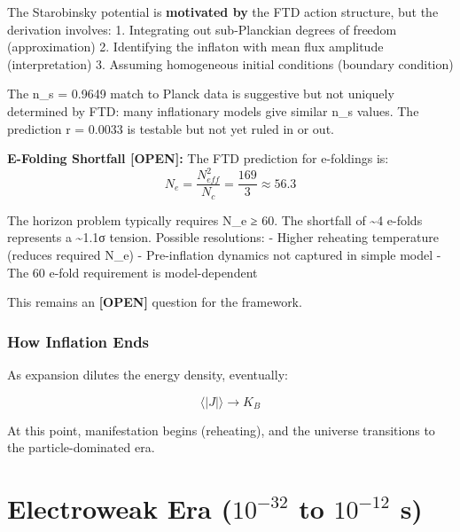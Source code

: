\documentclass[
  11pt,
  letterpaper,
  twoside,
  openright]{book}
\begin{document}
\begin{tcolorbox}[enhanced jigsaw, leftrule=.75mm, title=\textcolor{quarto-callout-warning-color}{\faExclamationTriangle}\hspace{0.5em}{Epistemic Status: Inflation {[}OPEN ISSUES{]}}, bottomrule=.15mm, opacityback=0, coltitle=black, arc=.35mm, colframe=quarto-callout-warning-color-frame, colbacktitle=quarto-callout-warning-color!10!white, colback=white, titlerule=0mm, breakable, bottomtitle=1mm, toptitle=1mm, rightrule=.15mm, toprule=.15mm, left=2mm, opacitybacktitle=0.6]

The Starobinsky potential is \textbf{motivated by} the FTD action
structure, but the derivation involves: 1. Integrating out sub-Planckian
degrees of freedom (approximation) 2. Identifying the inflaton with mean
flux amplitude (interpretation) 3. Assuming homogeneous initial
conditions (boundary condition)

The n\_s = 0.9649 match to Planck data is suggestive but not uniquely
determined by FTD: many inflationary models give similar n\_s values.
The prediction r = 0.0033 is testable but not yet ruled in or out.

\textbf{E-Folding Shortfall {[}OPEN{]}:} The FTD prediction for
e-foldings is:
\[N_e = \frac{N_{eff}^2}{N_c} = \frac{169}{3} \approx 56.3\]

The horizon problem typically requires N\_e ≥ 60. The shortfall of
\textasciitilde4 e-folds represents a \textasciitilde1.1σ tension.
Possible resolutions: - Higher reheating temperature (reduces required
N\_e) - Pre-inflation dynamics not captured in simple model - The 60
e-fold requirement is model-dependent

This remains an \textbf{{[}OPEN{]}} question for the framework.

\end{tcolorbox}

\subsubsection{How Inflation Ends}\label{how-inflation-ends}

As expansion dilutes the energy density, eventually:

\[\langle |J| \rangle \to K_B\]

At this point, manifestation begins (reheating), and the universe
transitions to the particle-dominated era.

\section{\texorpdfstring{Electroweak Era (\(10^{-32}\) to \(10^{-12}\)
s)}{Electroweak Era (10\^{}\{-32\} to 10\^{}\{-12\} s)}}\label{electroweak-era-10-32-to-10-12-s}
\end{document}

